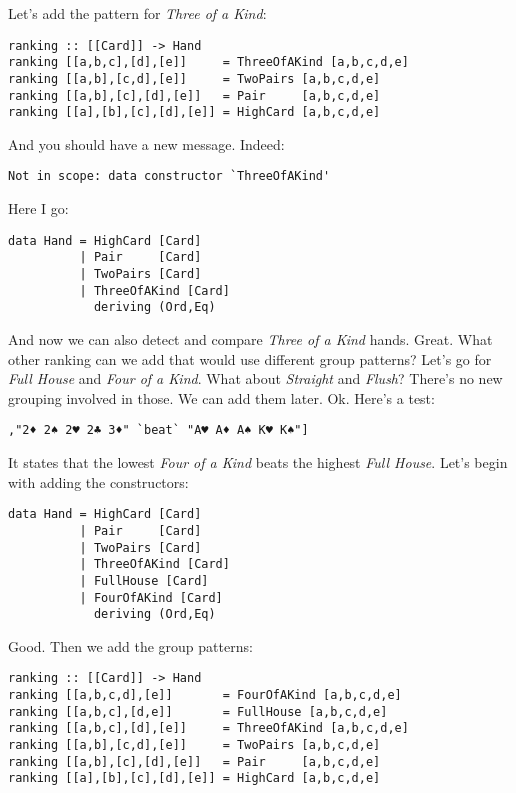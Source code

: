 \lhA \error Let's add the pattern for \emph{Three of a Kind}:
\begin{lstlisting}[frame=single]
ranking :: [[Card]] -> Hand
ranking [[a,b,c],[d],[e]]     = ThreeOfAKind [a,b,c,d,e]
ranking [[a,b],[c,d],[e]]     = TwoPairs [a,b,c,d,e]
ranking [[a,b],[c],[d],[e]]   = Pair     [a,b,c,d,e]
ranking [[a],[b],[c],[d],[e]] = HighCard [a,b,c,d,e] 
\end{lstlisting}
\error And you should have a new message.
\lhN Indeed: \\
\begin{small}
\begin{verbatim}
Not in scope: data constructor `ThreeOfAKind'
\end{verbatim}
\end{small}
\lhA Here I go:
\begin{lstlisting}[frame=single]
data Hand = HighCard [Card]
          | Pair     [Card]
          | TwoPairs [Card]
          | ThreeOfAKind [Card]
            deriving (Ord,Eq)
\end{lstlisting}
\success And now we can also detect and compare \emph{Three of a Kind} hands. 
\lhN Great. What other ranking can we add that would use different group patterns?
\lhA Let's go for \emph{Full House} and \emph{Four of a Kind}.
\lhN What about \emph{Straight} and \emph{Flush}?
\lhA There's no new grouping involved in those. We can add them later.
\lhN Ok. Here's a test:
\begin{lstlisting}[frame=single]
       ,"2♦ 2♠ 2♥ 2♣ 3♦" `beat` "A♥ A♦ A♠ K♥ K♠"]
\end{lstlisting}
It states that the lowest \emph{Four of a Kind} beats the highest \emph{Full House}.
\lhA \error Let's begin with adding the constructors:
\begin{lstlisting}[frame=single]
data Hand = HighCard [Card]
          | Pair     [Card]
          | TwoPairs [Card]
          | ThreeOfAKind [Card]
          | FullHouse [Card]
          | FourOfAKind [Card]
            deriving (Ord,Eq)
\end{lstlisting}
\lhN Good.
\lhA \error Then we add the group patterns:
\begin{lstlisting}[frame=single]
ranking :: [[Card]] -> Hand
ranking [[a,b,c,d],[e]]       = FourOfAKind [a,b,c,d,e]
ranking [[a,b,c],[d,e]]       = FullHouse [a,b,c,d,e]
ranking [[a,b,c],[d],[e]]     = ThreeOfAKind [a,b,c,d,e]
ranking [[a,b],[c,d],[e]]     = TwoPairs [a,b,c,d,e]
ranking [[a,b],[c],[d],[e]]   = Pair     [a,b,c,d,e]
ranking [[a],[b],[c],[d],[e]] = HighCard [a,b,c,d,e] 
\end{lstlisting}
